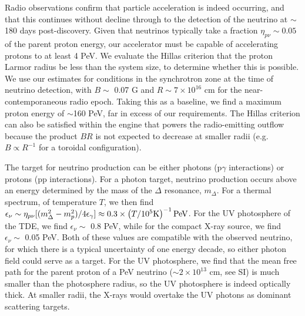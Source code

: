 \documentclass{nature_plusfigure}
\begin{document}
Radio observations confirm that particle acceleration is indeed occurring, and that this continues without decline through to the detection of the neutrino at $\sim$180 days post-discovery. Given that neutrinos typically take a fraction $\eta_{p\nu} \sim 0.05$ of the parent proton energy, our accelerator must be capable of accelerating protons to at least 4 PeV. We evaluate the Hillas criterion\cite{1984ARA&A..22..425H} that the proton Larmor radius be less than the system size, to determine whether this is possible. We use  our estimates for conditions in the synchrotron zone at the time of neutrino detection, with $B \sim$ 0.07 G and $R \sim 7 \times 10^{16}$ cm for the near-contemporaneous radio epoch. Taking this as a baseline, we find a maximum proton energy of $\sim$160 PeV, far in excess of our requirements. The Hillas criterion can also be satisfied within the engine that powers the radio-emitting outflow because the product $BR$ is not expected to decrease at smaller radii (e.g. $B \propto R^{-1}$ for a toroidal configuration). 

The target for neutrino production can be either photons (p$\gamma$ interactions) or protons (pp interactions). For a photon target, neutrino production occurs above an energy determined by the mass of the $\Delta$ resonance, $m_{\Delta}$. For a thermal spectrum, of temperature $T$, we then find $\epsilon_{\nu} \sim \eta_{p\nu}[(m_{\Delta}^{2} - m_{p}^{2})/ 4 \epsilon_\gamma ] \approx 0.3 \times \left(T/10^{5} \rm K \right)^{-1} \rm PeV$. For the UV photosphere of the TDE, we find $\epsilon_\nu \sim$ 0.8 PeV, while for the compact X-ray source, we find $\epsilon_\nu \sim$ 0.05 PeV. Both of these values are compatible with the observed neutrino, for which there is a typical uncertainty of one energy decade\cite{2018Sci...361.1378I}, so either photon field could serve as a target. For the UV photosphere, we find that the mean free path for the parent proton of a PeV neutrino ($\sim2 \times 10^{13}$ cm, see SI) is much smaller than the photosphere radius, so the UV photosphere is indeed optically thick. At smaller radii, the X-rays would overtake the UV photons as dominant scattering targets. 
\end{document}
